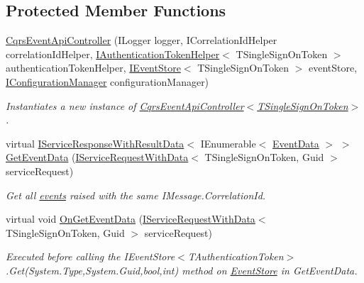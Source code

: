\subsection*{Protected Member Functions}
\begin{DoxyCompactItemize}
\item 
\hyperlink{classCqrs_1_1WebApi_1_1CqrsEventApiController_a5f1162d692213363fdcaf898f439f7dd_a5f1162d692213363fdcaf898f439f7dd}{Cqrs\+Event\+Api\+Controller} (I\+Logger logger, I\+Correlation\+Id\+Helper correlation\+Id\+Helper, \hyperlink{interfaceCqrs_1_1Authentication_1_1IAuthenticationTokenHelper}{I\+Authentication\+Token\+Helper}$<$ T\+Single\+Sign\+On\+Token $>$ authentication\+Token\+Helper, \hyperlink{interfaceCqrs_1_1Events_1_1IEventStore}{I\+Event\+Store}$<$ T\+Single\+Sign\+On\+Token $>$ event\+Store, \hyperlink{interfaceCqrs_1_1Configuration_1_1IConfigurationManager}{I\+Configuration\+Manager} configuration\+Manager)
\begin{DoxyCompactList}\small\item\em Instantiates a new instance of \hyperlink{classCqrs_1_1WebApi_1_1CqrsEventApiController_a5f1162d692213363fdcaf898f439f7dd_a5f1162d692213363fdcaf898f439f7dd}{Cqrs\+Event\+Api\+Controller$<$\+T\+Single\+Sign\+On\+Token$>$}. \end{DoxyCompactList}\item 
virtual \hyperlink{interfaceCqrs_1_1Services_1_1IServiceResponseWithResultData}{I\+Service\+Response\+With\+Result\+Data}$<$ I\+Enumerable$<$ \hyperlink{classCqrs_1_1Events_1_1EventData}{Event\+Data} $>$ $>$ \hyperlink{classCqrs_1_1WebApi_1_1CqrsEventApiController_aac0079ced115761a0ab605eaebe0801b_aac0079ced115761a0ab605eaebe0801b}{Get\+Event\+Data} (\hyperlink{interfaceCqrs_1_1Services_1_1IServiceRequestWithData}{I\+Service\+Request\+With\+Data}$<$ T\+Single\+Sign\+On\+Token, Guid $>$ service\+Request)
\begin{DoxyCompactList}\small\item\em Get all \hyperlink{}{events} raised with the same I\+Message.\+Correlation\+Id. \end{DoxyCompactList}\item 
virtual void \hyperlink{classCqrs_1_1WebApi_1_1CqrsEventApiController_a705b40b973640de14f7b8b7b4c6eb1fe_a705b40b973640de14f7b8b7b4c6eb1fe}{On\+Get\+Event\+Data} (\hyperlink{interfaceCqrs_1_1Services_1_1IServiceRequestWithData}{I\+Service\+Request\+With\+Data}$<$ T\+Single\+Sign\+On\+Token, Guid $>$ service\+Request)
\begin{DoxyCompactList}\small\item\em Executed before calling the I\+Event\+Store$<$\+T\+Authentication\+Token$>$.\+Get(\+System.\+Type,\+System.\+Guid,bool,int) method on \hyperlink{namespaceCqrs_1_1EventStore}{Event\+Store} in Get\+Event\+Data. \end{DoxyCompactList}\item 

\end{DoxyCompactItemize}
